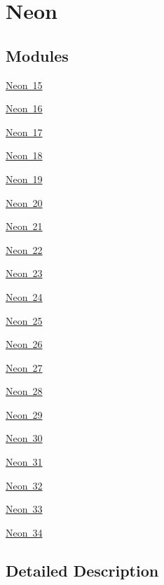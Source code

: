 \hypertarget{group___isotope_const-_neon}{}\section{Neon}
\label{group___isotope_const-_neon}
\subsection*{Modules}
\begin{DoxyCompactItemize}
\item 
\mbox{\hyperlink{group___isotope_const-_neon-_ne15}{Neon 15}}
\item 
\mbox{\hyperlink{group___isotope_const-_neon-_ne16}{Neon 16}}
\item 
\mbox{\hyperlink{group___isotope_const-_neon-_ne17}{Neon 17}}
\item 
\mbox{\hyperlink{group___isotope_const-_neon-_ne18}{Neon 18}}
\item 
\mbox{\hyperlink{group___isotope_const-_neon-_ne19}{Neon 19}}
\item 
\mbox{\hyperlink{group___isotope_const-_neon-_ne20}{Neon 20}}
\item 
\mbox{\hyperlink{group___isotope_const-_neon-_ne21}{Neon 21}}
\item 
\mbox{\hyperlink{group___isotope_const-_neon-_ne22}{Neon 22}}
\item 
\mbox{\hyperlink{group___isotope_const-_neon-_ne23}{Neon 23}}
\item 
\mbox{\hyperlink{group___isotope_const-_neon-_ne24}{Neon 24}}
\item 
\mbox{\hyperlink{group___isotope_const-_neon-_ne25}{Neon 25}}
\item 
\mbox{\hyperlink{group___isotope_const-_neon-_ne26}{Neon 26}}
\item 
\mbox{\hyperlink{group___isotope_const-_neon-_ne27}{Neon 27}}
\item 
\mbox{\hyperlink{group___isotope_const-_neon-_ne28}{Neon 28}}
\item 
\mbox{\hyperlink{group___isotope_const-_neon-_ne29}{Neon 29}}
\item 
\mbox{\hyperlink{group___isotope_const-_neon-_ne30}{Neon 30}}
\item 
\mbox{\hyperlink{group___isotope_const-_neon-_ne31}{Neon 31}}
\item 
\mbox{\hyperlink{group___isotope_const-_neon-_ne32}{Neon 32}}
\item 
\mbox{\hyperlink{group___isotope_const-_neon-_ne33}{Neon 33}}
\item 
\mbox{\hyperlink{group___isotope_const-_neon-_ne34}{Neon 34}}
\end{DoxyCompactItemize}


\subsection{Detailed Description}
